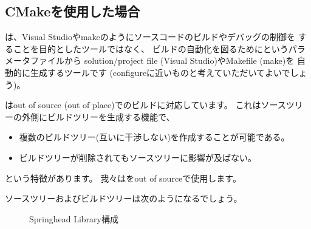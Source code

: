 \subsection{CMakeを使用した場合}
\label{subsec:WhenUsedCMake}

\noindent
\cmake は、Visual Studioやmakeのようにソースコードのビルドやデバッグの制御を
することを目的としたツールではなく、
ビルドの自動化を図るために\CMakeLists というパラメータファイルから
solution/project file (Visual Studio)やMakefile (make)を
自動的に生成するツールです
(configureに近いものと考えていただいてよいでしょう)。

\cmake はout of source (out of place)でのビルドに対応しています。
これはソースツリーの外側にビルドツリーを生成する機能で、
\begin{itemize}
  \item	複数のビルドツリー(互いに干渉しない)を作成することが可能である。
  \item	ビルドツリーが削除されてもソースツリーに影響が及ばない。
\end{itemize}
という特徴があります。
我々は\cmake をout of sourceで使用します。

\medskip
ソースツリーおよびビルドツリーは次のようになるでしょう。

\medskip
\begin{narrow}\begin{figure}
    \begin{narrow}\begin{minipage}{\textwidth}
	\medskip
    \end{minipage}\end{narrow}
    \caption{Springhead Library構成}
    \label{fig:SpringheadLibraryTree}
\end{figure}\end{narrow}

